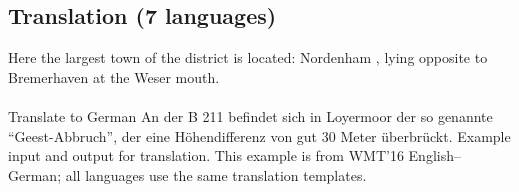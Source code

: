  
\subsection{Translation (7 languages)}\label{appen:data-to-text}

\taskio
{Here the largest town of the district is located: Nordenham , lying opposite to Bremerhaven at the Weser mouth.\\\\Translate to German}
{An der B 211 befindet sich in Loyermoor der so genannte ``Geest-Abbruch'', der eine Höhendifferenz von gut 30 Meter überbrückt.}
{
Example input and output for translation. This example is from WMT'16 English--German; all languages use the same translation templates.
}

